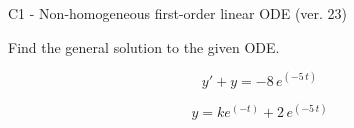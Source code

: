 \begin{exercise}
  \begin{exerciseTitle}C1 - Non-homogeneous first-order linear ODE (ver. 23)\end{exerciseTitle}
  \begin{exerciseStatement}
    
Find the general solution to the given ODE.

    
\[y'+y= -8 \, e^{\left(-5 \, t\right)}\]

  \end{exerciseStatement}
  \begin{exerciseAnswer}
    
\[y= k e^{\left(-t\right)} + 2 \, e^{\left(-5 \, t\right)}\]

  \end{exerciseAnswer}
\end{exercise}